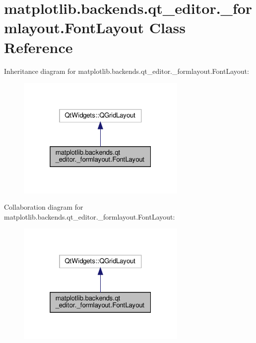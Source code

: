 \hypertarget{classmatplotlib_1_1backends_1_1qt__editor_1_1__formlayout_1_1FontLayout}{}\section{matplotlib.\+backends.\+qt\+\_\+editor.\+\_\+formlayout.\+Font\+Layout Class Reference}
\label{classmatplotlib_1_1backends_1_1qt__editor_1_1__formlayout_1_1FontLayout}


Inheritance diagram for matplotlib.\+backends.\+qt\+\_\+editor.\+\_\+formlayout.\+Font\+Layout\+:
\nopagebreak
\begin{figure}[H]
\begin{center}
\leavevmode
\includegraphics[width=232pt]{classmatplotlib_1_1backends_1_1qt__editor_1_1__formlayout_1_1FontLayout__inherit__graph}
\end{center}
\end{figure}


Collaboration diagram for matplotlib.\+backends.\+qt\+\_\+editor.\+\_\+formlayout.\+Font\+Layout\+:
\nopagebreak
\begin{figure}[H]
\begin{center}
\leavevmode
\includegraphics[width=232pt]{classmatplotlib_1_1backends_1_1qt__editor_1_1__formlayout_1_1FontLayout__coll__graph}
\end{center}
\end{figure}

